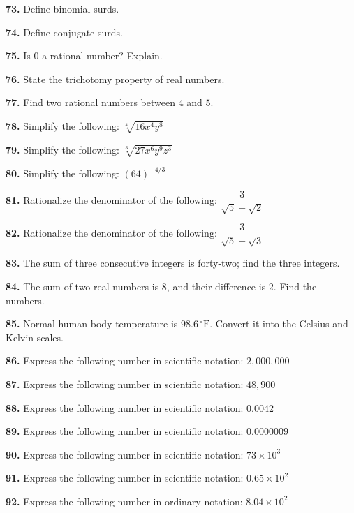 \documentclass[11pt]{article}
\begin{document}
\bigskip
\noindent\textbf{73.} Define binomial surds.

\bigskip
\noindent\textbf{74.} Define conjugate surds.

\bigskip
\noindent\textbf{75.} Is $0$ a rational number? Explain.

\bigskip
\noindent\textbf{76.} State the trichotomy property of real numbers.

\bigskip
\noindent\textbf{77.} Find two rational numbers between $4$ and $5$.

\bigskip
\noindent\textbf{78.} Simplify the following: $\sqrt[4]{16x^4y^8}$

\bigskip
\noindent\textbf{79.} Simplify the following: $\sqrt[3]{27x^6y^9z^3}$

\bigskip
\noindent\textbf{80.} Simplify the following: $(64)^{-4/3}$

\bigskip
\noindent\textbf{81.} Rationalize the denominator of the following: $\dfrac{3}{\sqrt{5}+\sqrt{2}}$

\bigskip
\noindent\textbf{82.} Rationalize the denominator of the following: $\dfrac{3}{\sqrt{5}-\sqrt{3}}$

\bigskip
\noindent\textbf{83.} The sum of three consecutive integers is forty-two; find the three integers.

\bigskip
\noindent\textbf{84.} The sum of two real numbers is $8$, and their difference is $2$. Find the numbers.

\bigskip
\noindent\textbf{85.} Normal human body temperature is $98.6\,^{\circ}\text{F}$. Convert it into the Celsius and Kelvin scales.

\bigskip
\noindent\textbf{86.} Express the following number in scientific notation: $2{,}000{,}000$

\bigskip
\noindent\textbf{87.} Express the following number in scientific notation: $48{,}900$

\bigskip
\noindent\textbf{88.} Express the following number in scientific notation: $0.0042$

\bigskip
\noindent\textbf{89.} Express the following number in scientific notation: $0.0000009$

\bigskip
\noindent\textbf{90.} Express the following number in scientific notation: $73\times10^3$

\bigskip
\noindent\textbf{91.} Express the following number in scientific notation: $0.65\times10^2$

\bigskip
\noindent\textbf{92.} Express the following number in ordinary notation: $8.04\times10^2$
\end{document}
